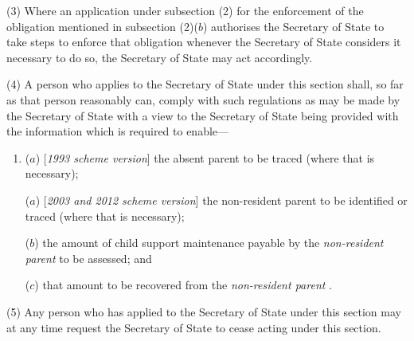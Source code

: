 \documentclass[12pt,a4paper]{article}
\begin{document}
(3) Where an application under subsection (2)  for the enforcement of the obligation mentioned in subsection (2)($b$)  authorises the 
Secretary of State  %
to take steps to enforce that obligation whenever 
the Secretary of State  %
considers it necessary to do so, the 
Secretary of State  %
may act accordingly.

(4) A person who applies to the 
Secretary of State  %
under this section shall, so far as that person reasonably can, comply with such regulations as may be made by the Secretary of State with a view to the 
Secretary of State  %
being provided with the information which is required to enable—
\begin{enumerate}\item[]
($a$) [\emph{1993 scheme version}] the absent parent to be traced (where that is necessary);

($a$) [\emph{2003 and 2012 scheme version}] the 
non-resident parent  %
to be 
identified or  %
traced (where that is necessary);

($b$) the amount of child support maintenance payable by the 
\emph{non-resident parent}  %
to be assessed; and

($c$) that amount to be recovered from the 
\emph{non-resident parent}%
.
\end{enumerate}

(5) Any person who has applied to the 
Secretary of State  %
under this section may at any time request 
the Secretary of State  %
to cease acting under this section.
\end{document}

